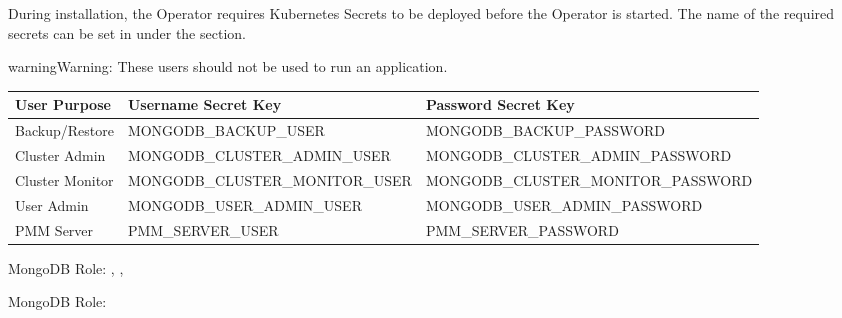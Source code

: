 \documentclass[letterpaper,10pt,english]{sphinxmanual}
\begin{document}
During installation, the Operator requires
Kubernetes Secrets to be deployed before the Operator is started. The name of the
required secrets can be set in  under the
 section.

 

 

\begin{sphinxadmonition}{warning}{Warning:}
These users should not be used to run an application.
\end{sphinxadmonition}


\begin{savenotes}\sphinxattablestart
\centering
\begin{tabulary}{\linewidth}[t]{|T|T|T|}
\hline
\sphinxstyletheadfamily 
User Purpose
&\sphinxstyletheadfamily 
Username Secret Key
&\sphinxstyletheadfamily 
Password Secret Key
\\
\hline
Backup/Restore
&
MONGODB\_BACKUP\_USER
&
MONGODB\_BACKUP\_PASSWORD
\\
\hline
Cluster Admin
&
MONGODB\_CLUSTER\_ADMIN\_USER
&
MONGODB\_CLUSTER\_ADMIN\_PASSWORD
\\
\hline
Cluster Monitor
&
MONGODB\_CLUSTER\_MONITOR\_USER
&
MONGODB\_CLUSTER\_MONITOR\_PASSWORD
\\
\hline
User Admin
&
MONGODB\_USER\_ADMIN\_USER
&
MONGODB\_USER\_ADMIN\_PASSWORD
\\
\hline
PMM Server
&
PMM\_SERVER\_USER
&
PMM\_SERVER\_PASSWORD
\\
\hline
\end{tabulary}
\par
\sphinxattableend\end{savenotes}

 \sphinxhyphen{} MongoDB Role: , , 

 \sphinxhyphen{} MongoDB Role: 
\end{document}
